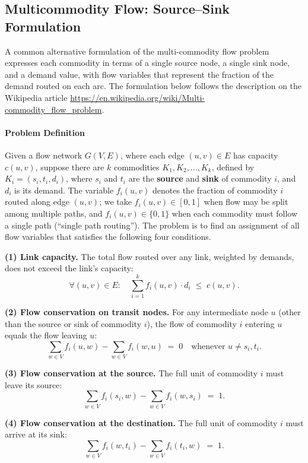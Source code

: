 \subsection{Multicommodity Flow: Source--Sink Formulation}
\label{sec:multicommodity-source-sink}

A common alternative formulation of the multi-commodity flow problem expresses each commodity in terms of a single source node, a single sink node, and a demand value, with flow variables that represent the fraction of the demand routed on each arc. The formulation below follows the description on the Wikipedia article \url{https://en.wikipedia.org/wiki/Multi-commodity_flow_problem}.

\paragraph{Problem Definition}
Given a flow network \(G(V,E)\), where each edge \((u,v) \in E\) has capacity \(c(u,v)\), suppose there are \(k\) commodities
\(K_1,K_2,\dots,K_k\), defined by \(K_i=(s_i,t_i,d_i)\), where \(s_i\) and \(t_i\) are the \textbf{source} and \textbf{sink} of commodity \(i\), and \(d_i\) is its demand. The variable \(f_i(u,v)\) denotes the fraction of commodity \(i\) routed along edge \((u,v)\); we take \(f_i(u,v) \in [0,1]\) when flow may be split among multiple paths, and \(f_i(u,v) \in \{0,1\}\) when each commodity must follow a single path (``single path routing''). The problem is to find an assignment of all flow variables that satisfies the following four conditions.

\textbf{(1) Link capacity.} The total flow routed over any link, weighted by demands, does not exceed the link's capacity:
\[
\forall (u,v)\in E:\quad \sum_{i=1}^{k} f_i(u,v)\cdot d_i \;\leq\; c(u,v).
\]

\textbf{(2) Flow conservation on transit nodes.} For any intermediate node \(u\) (other than the source or sink of commodity \(i\)), the flow of commodity \(i\) entering \(u\) equals the flow leaving \(u\):
\[
\sum_{w \in V} f_i(u,w) - \sum_{w \in V} f_i(w,u) \;=\; 0 \quad \text{whenever } u \neq s_i, t_i.
\]

\textbf{(3) Flow conservation at the source.} The full unit of commodity \(i\) must leave its source:
\[
\sum_{w \in V} f_i(s_i,w) - \sum_{w \in V} f_i(w,s_i) \;=\; 1.
\]

\textbf{(4) Flow conservation at the destination.} The full unit of commodity \(i\) must arrive at its sink:
\[
\sum_{w \in V} f_i(w,t_i) - \sum_{w \in V} f_i(t_i,w) \;=\; 1.
\]

